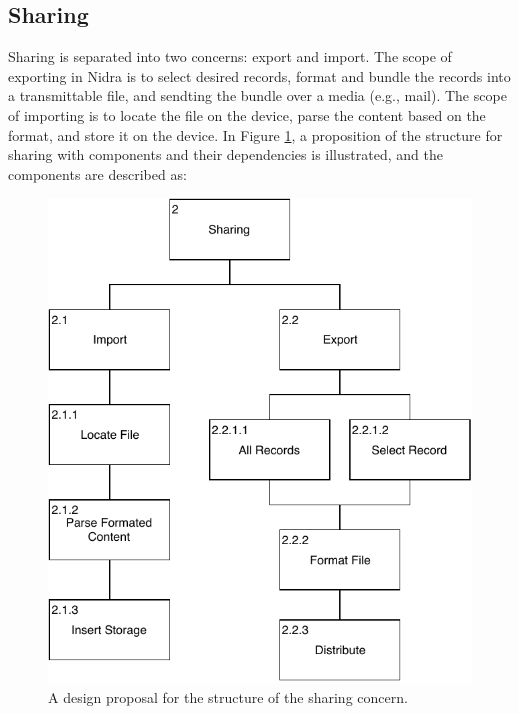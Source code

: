 \subsection{Sharing} \label{sec:design_sharing}

Sharing is separated into two concerns: export and import. The scope of exporting in Nidra is to select desired records, format and bundle the records into a transmittable file, and sendting the bundle over a media (e.g., mail). The scope of importing is to locate the file on the device, parse the content based on the format, and store it on the device. In Figure \ref{fig:hta_sharing}, a proposition of the structure for sharing with components and their dependencies is illustrated, and the components are described as:


\begin{figure}
    \centering
    \includegraphics[scale=0.8]{images/Sharing_Design.pdf}
    \caption{A design proposal for the structure of the sharing concern.}
    \label{fig:hta_sharing}
\end{figure}


